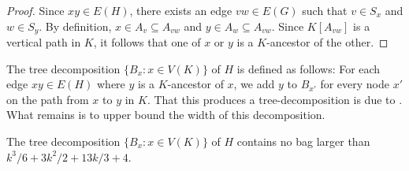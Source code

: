 \documentclass{patmorin}
\newcommand{\bagsize}{\ensuremath{k^3/6 + 3k^2/2 + 13k/3 + 4}}
\begin{document}
 \begin{proof}
   Since $xy\in E(H)$, there exists an edge $vw\in E(G)$ such that $v\in S_x$ and $w\in S_y$.  By definition, $x\in A_v\subseteq A_{vw}$ and $y\in A_w\subseteq A_{vw}$.  Since $K[A_{vw}]$ is a vertical path in $K$, it follows that one of $x$ or $y$ is a $K$-ancestor of the other. 
\end{proof}

The tree decomposition $\{B_x:x\in V(K)\}$ of $H$ is defined as follows: For each edge $xy\in E(H)$ where $y$ is a $K$-ancestor of $x$, we add $y$ to $B_{x'}$ for every node $x'$ on the path from $x$ to $y$ in $K$.  That this produces a tree-decomposition is due to .  What remains is to upper bound the width of this decomposition.

\begin{clm}
  The tree decomposition $\{B_x: x\in V(K)\}$ of $H$ contains no bag larger than $\bagsize$.
\end{clm}
\end{document}
